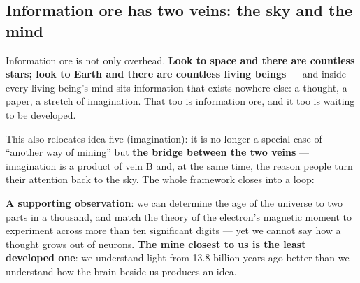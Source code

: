\documentclass[11pt,fontset=none]{ctexart}
\begin{document}

\subsection{Information ore has two veins: the sky and the mind}

Information ore is not only overhead. \textbf{Look to space and there are countless stars; look to Earth and there are countless living beings} --- and inside every living being's mind sits information that exists nowhere else: a thought, a paper, a stretch of imagination. That too is information ore, and it too is waiting to be developed.


This also relocates idea five (imagination): it is no longer a special case of ``another way of mining'' but \textbf{the bridge between the two veins} --- imagination is a product of vein B and, at the same time, the reason people turn their attention back to the sky. The whole framework closes into a loop:


\textbf{A supporting observation}: we can determine the age of the universe to two parts in a thousand, and match the theory of the electron's magnetic moment to experiment across more than ten significant digits --- yet we cannot say how a thought grows out of neurons. \textbf{The mine closest to us is the least developed one}: we understand light from 13.8 billion years ago better than we understand how the brain beside us produces an idea.
\end{document}
